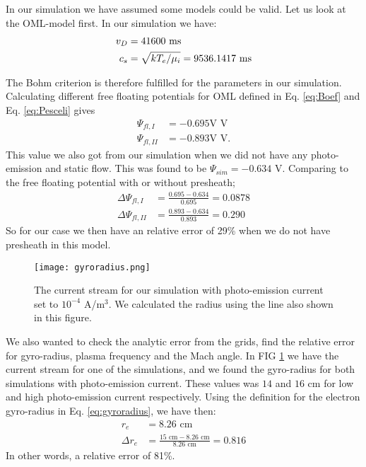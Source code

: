 \documentclass[aip, 
rsi, 
amsmath,
amssymb,
longbibliography,
preprint]{revtex4-1}
\begin{document}
In our simulation we have assumed some models could be valid. Let us look at the OML-model first. In our simulation we have:
\begin{align*}
v_D &= 41600 \, \, \text{m\/s}\\
c_s &= \sqrt{k T_e / \mu_i} = 9536.1417 \, \, \text{m\/s}
\end{align*}

The Bohm criterion is therefore fulfilled for the parameters in our simulation. Calculating different free floating potentials for OML defined in Eq. \ref{eq:Boef} and Eq. \ref{eq:Pesceli} gives
\begin{align*}
\Psi_{fl,I} &= -0.695\text{V} \, \, \text{V}\\
\Psi_{fl,II}&= -0.893 \text{V}\, \, \text{V}.
\end{align*}
This value we also got from our simulation when we did not have any photo-emission and static flow. This was found to be $\Psi_{sim} = -0.634$ V. Comparing to the free floating potential with or without presheath;
\begin{align*}
\Delta \Psi_{fl,I} &= \frac{0.695-0.634}{0.695} = 0.0878\\
\Delta \Psi_{fl,II} &= \frac{0.893-0.634}{0.893} = 0.290
\end{align*}
So for our case we then have an relative error of 29\% when we do not have presheath in this model.\\

\begin{figure}
\texttt{[image: gyroradius.png]}
\caption{The current stream for our simulation with photo-emission current set to $10^{-4}$ A/m$^3$. We calculated the radius using the line also shown in this figure.\label{fig:gyroradius}}
\end{figure}

We also wanted to check the analytic error from the grids, find the relative error for gyro-radius, plasma frequency and the Mach angle. In FIG \ref{fig:gyroradius} we have the current stream for one of the simulations, and we found the gyro-radius for both simulations with photo-emission current. These values was $14$ and $16$ cm for low and high photo-emission current respectively. Using the definition for the electron gyro-radius in Eq. \ref{eq:gyroradius}, we have then:
\begin{align*}
r_e &= 8.26 \, \, \text{cm}\\
\Delta r_e &= \frac{15 \, \, \text{cm}- 8.26 \, \, \text{cm}}{8.26 \, \, \text{cm}} = 0.816
\end{align*}
In other words, a relative error of 81\%.\\
\end{document}
